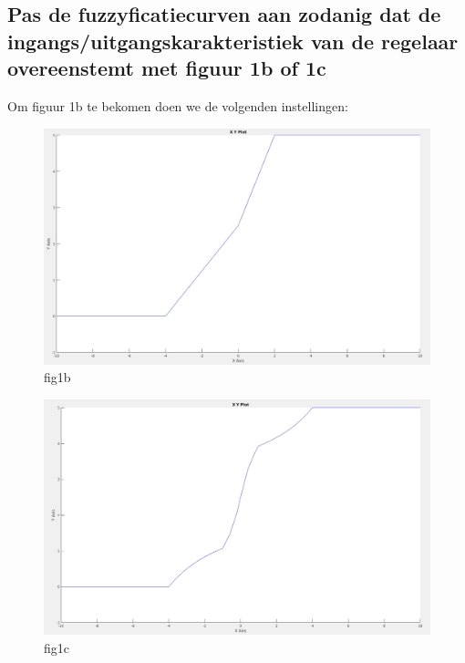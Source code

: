 \documentclass[a4paper, 12pt]{article}
\begin{document}
\subsection{Pas de fuzzyficatiecurven aan zodanig dat de ingangs/uitgangskarakteristiek van de regelaar overeenstemt met figuur 1b of 1c}

Om figuur 1b te bekomen doen we de volgenden instellingen: 
\begin{table}[!h]
\centering
{}
\end{table}

\begin{figure}[!h]
	\includegraphics[width=0.9\linewidth]{Labo4_1_fig1b.jpg}
	\caption{fig1b}
\end{figure}

\newpage

\begin{table}[!h]
\centering
{}
\end{table}

\begin{figure}[!h]
	\includegraphics[width=0.9\linewidth]{Labo4_1_fig1c.jpg}
	\caption{fig1c}
\end{figure}
\end{document}
